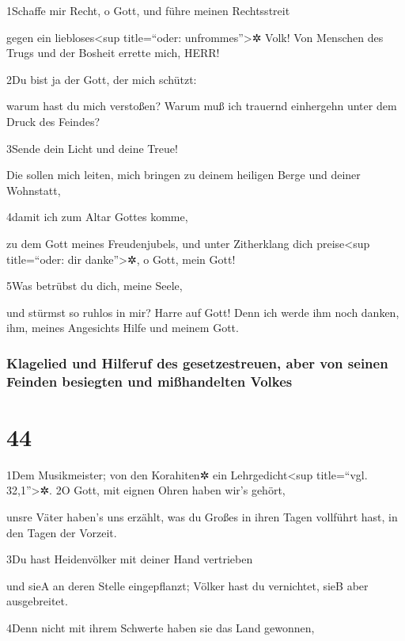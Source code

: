 1Schaffe mir Recht, o Gott, und führe meinen Rechtsstreit

gegen ein liebloses\textless sup title=``oder: unfrommes''\textgreater✲
Volk! Von Menschen des Trugs und der Bosheit errette mich, HERR!

2Du bist ja der Gott, der mich schützt:

warum hast du mich verstoßen? Warum muß ich trauernd einhergehn unter
dem Druck des Feindes?

3Sende dein Licht und deine Treue!

Die sollen mich leiten, mich bringen zu deinem heiligen Berge und deiner
Wohnstatt,

4damit ich zum Altar Gottes komme,

zu dem Gott meines Freudenjubels, und unter Zitherklang dich
preise\textless sup title=``oder: dir danke''\textgreater✲, o Gott, mein
Gott!

5Was betrübst du dich, meine Seele,

und stürmst so ruhlos in mir? Harre auf Gott! Denn ich werde ihm noch
danken, ihm, meines Angesichts Hilfe und meinem Gott.

\hypertarget{klagelied-und-hilferuf-des-gesetzestreuen-aber-von-seinen-feinden-besiegten-und-miuxdfhandelten-volkes}{%
\subsubsection{Klagelied und Hilferuf des gesetzestreuen, aber von
seinen Feinden besiegten und mißhandelten
Volkes}\label{klagelied-und-hilferuf-des-gesetzestreuen-aber-von-seinen-feinden-besiegten-und-miuxdfhandelten-volkes}}

\hypertarget{section-43}{%
\section{44}\label{section-43}}

1Dem Musikmeister; von den Korahiten✲ ein Lehrgedicht\textless sup
title=``vgl. 32,1''\textgreater✲. 2O Gott, mit eignen Ohren haben wir's
gehört,

unsre Väter haben's uns erzählt, was du Großes in ihren Tagen vollführt
hast, in den Tagen der Vorzeit.

3Du hast Heidenvölker mit deiner Hand vertrieben

und sie{A} an deren Stelle eingepflanzt; Völker hast du vernichtet,
sie{B} aber ausgebreitet.

4Denn nicht mit ihrem Schwerte haben sie das Land gewonnen,

